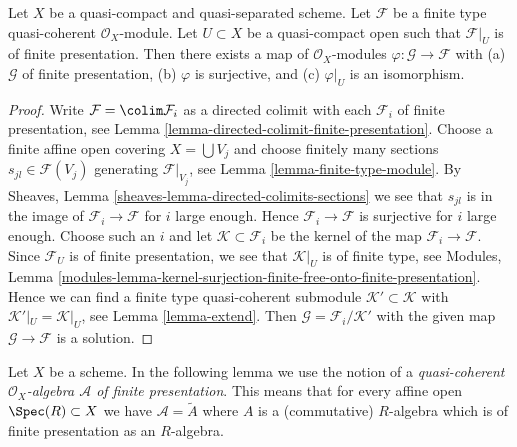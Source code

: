 \begin{lemma}
\label{lemma-application-directed-colimit}
Let $X$ be a quasi-compact and quasi-separated scheme.
Let $\mathcal{F}$ be a finite type quasi-coherent $\mathcal{O}_X$-module.
Let $U \subset X$ be a quasi-compact open such that $\mathcal{F}|_U$
is of finite presentation. Then there exists a map of $\mathcal{O}_X$-modules
$\varphi : \mathcal{G} \to \mathcal{F}$ with
(a) $\mathcal{G}$ of finite presentation,
(b) $\varphi$ is surjective, and
(c) $\varphi|_U$ is an isomorphism.
\end{lemma}

\begin{proof}
Write $\mathcal{F} = \colim \mathcal{F}_i$ as a directed colimit
with each $\mathcal{F}_i$ of finite presentation,
see Lemma \ref{lemma-directed-colimit-finite-presentation}.
Choose a finite affine open covering $X = \bigcup V_j$ and choose
finitely many sections $s_{jl} \in \mathcal{F}(V_j)$ generating
$\mathcal{F}|_{V_j}$, see Lemma \ref{lemma-finite-type-module}.
By Sheaves, Lemma \ref{sheaves-lemma-directed-colimits-sections}
we see that $s_{jl}$ is in the image of $\mathcal{F}_i \to \mathcal{F}$
for $i$ large enough. Hence $\mathcal{F}_i \to \mathcal{F}$ is surjective
for $i$ large enough. Choose such an $i$ and let
$\mathcal{K} \subset \mathcal{F}_i$ be the kernel of the map
$\mathcal{F}_i \to \mathcal{F}$. Since $\mathcal{F}_U$ is of finite
presentation, we see that $\mathcal{K}|_U$ is of finite type, see
Modules, Lemma
\ref{modules-lemma-kernel-surjection-finite-free-onto-finite-presentation}.
Hence we can find a finite type quasi-coherent submodule
$\mathcal{K}' \subset \mathcal{K}$ with $\mathcal{K}'|_U = \mathcal{K}|_U$,
see Lemma \ref{lemma-extend}. Then
$\mathcal{G} = \mathcal{F}_i/\mathcal{K}'$
with the given map $\mathcal{G} \to \mathcal{F}$ is a solution.
\end{proof}

\noindent
Let $X$ be a scheme. In the following lemma we use the notion
of a {\it quasi-coherent $\mathcal{O}_X$-algebra $\mathcal{A}$
of finite presentation}. This means that for every affine open
$\Spec(R) \subset X$ we have $\mathcal{A} = \widetilde{A}$
where $A$ is a (commutative) $R$-algebra which is of finite presentation
as an $R$-algebra.

